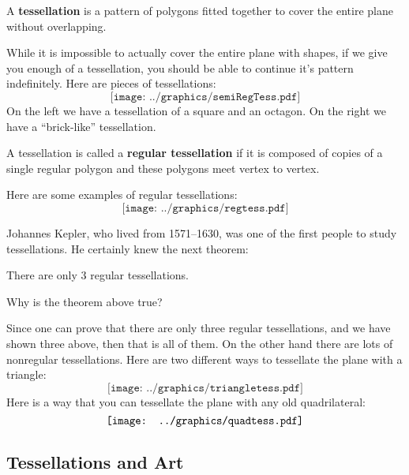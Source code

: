 \begin{definition} A \textbf{tessellation} is a pattern of 
polygons fitted together to cover the entire plane without
overlapping.  
\end{definition}
While it is impossible to actually cover the entire plane with shapes,
if we give you enough of a tessellation, you should be able to continue
it's pattern indefinitely.  Here are pieces of tessellations:
\[
\texttt{[image: ../graphics/semiRegTess.pdf]}
\]
On the left we have a tessellation of a square and an octagon. On the
right we have a ``brick-like'' tessellation.

\begin{definition}
A tessellation is called a \textbf{regular tessellation} if it is
composed of copies of a single regular polygon and these polygons meet
vertex to vertex.
\end{definition}


\begin{example} Here are some examples of regular tessellations:
\[
\texttt{[image: ../graphics/regtess.pdf]}
\]
\end{example}

Johannes Kepler, who lived from 1571--1630,
was one of the first people to study tessellations. He certainly knew
the next theorem:

\begin{theorem} There are only $3$ regular tessellations.
\end{theorem}

\begin{question} Why is the theorem above true?
\end{question}
\QM

Since one can prove that there are only three regular tessellations,
and we have shown three above, then that is all of them. On the other
hand there are lots of nonregular tessellations. Here are two
different ways to tessellate the plane with a
triangle:
\[
\texttt{[image: ../graphics/triangletess.pdf]}
\]
Here is a way that you can tessellate the plane with any old
quadrilateral:
\[\index{tessellation!any quadrilateral}\index{quadrilateral!tessellation of}
\texttt{[image: ../graphics/quadtess.pdf]}
\]

\subsection{Tessellations and Art}

